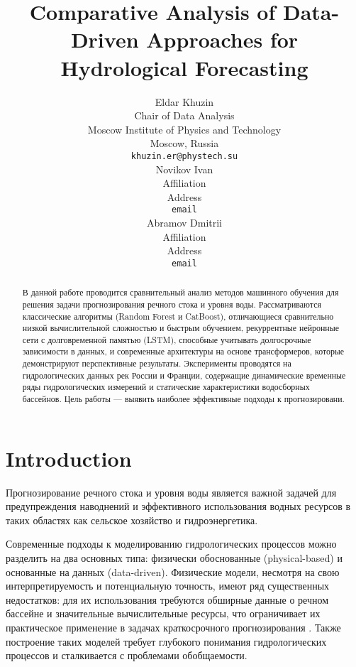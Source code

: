 \documentclass{article}
\title{Comparative Analysis of Data-Driven Approaches for Hydrological Forecasting}
\author{%
    Eldar Khuzin \\
    Chair of Data Analysis\\
    Moscow Institute of Physics and Technology\\
    Moscow, Russia \\
    \texttt{khuzin.er@phystech.su} \\
    \And
    Novikov Ivan \\
    Affiliation \\
    Address \\
    \texttt{email} \\
    \AND
    Abramov Dmitrii \\
    Affiliation \\
    Address \\
    \texttt{email}
}
\date{}
\begin{document}
\maketitle

\begin{abstract}
	В данной работе проводится сравнительный анализ методов машинного обучения для решения задачи прогнозирования речного стока и уровня воды. Рассматриваются классические алгоритмы (Random Forest и CatBoost), отличающиеся сравнительно низкой вычислительной сложностью и быстрым обучением, рекуррентные нейронные сети с долговременной памятью (LSTM), способные учитывать долгосрочные зависимости в данных, и современные архитектуры на основе трансформеров, которые демонстрируют перспективные результаты. Эксперименты проводятся на гидрологических данных рек России и Франции, содержащие динамические временные ряды гидрологических измерений и статические характеристики водосборных бассейнов. Цель работы — выявить наиболее эффективные подходы к прогнозировани.
\end{abstract}


\section{Introduction}
\label{sec:introduction}

Прогнозирование речного стока и уровня воды является важной задачей для предупреждения наводнений и эффективного использования водных ресурсов в таких областях как сельское хозяйство и гидроэнергетика.\cite{laversVisionHydrologicalPrediction2020}

Современные подходы к моделированию гидрологических процессов можно разделить на два основных типа: физически обоснованные (physical-based) и основанные на данных (data-driven). Физические модели, несмотря на свою интерпретируемость и потенциальную точность, имеют ряд существенных недостатков: для их использования требуются обширные данные о речном бассейне и значительные вычислительные ресурсы, что ограничивает их практическое применение в задачах краткосрочного прогнозирования \cite{bellosHybridMethodFlood2016}. Также построение таких моделей требует глубокого понимания гидрологических процессов и сталкивается с проблемами обобщаемости.
\end{document}
